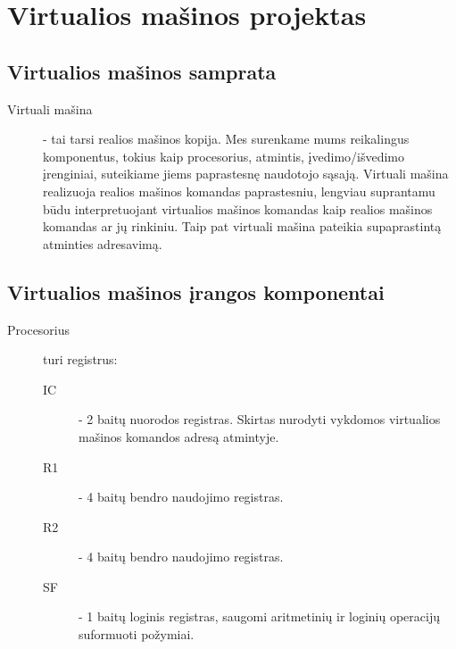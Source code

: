 \section{Virtualios mašinos projektas}

\subsection{Virtualios mašinos samprata}
\begin{description}
\item[Virtuali mašina] - tai tarsi realios mašinos kopija. Mes
surenkame mums reikalingus komponentus, tokius kaip procesorius,
atmintis, įvedimo/išvedimo įrenginiai, suteikiame jiems paprastesnę
naudotojo sąsają. Virtuali mašina realizuoja realios mašinos
komandas paprastesniu, lengviau suprantamu būdu interpretuojant virtualios
mašinos komandas kaip realios mašinos komandas ar jų rinkiniu. Taip pat 
virtuali mašina pateikia supaprastintą atminties adresavimą.
\end{description}

\subsection{Virtualios mašinos įrangos komponentai}
\begin{description}
    \item[Procesorius] turi registrus:
    \begin{description}
        \item[IC] - 2 baitų nuorodos registras. Skirtas nurodyti vykdomos virtualios mašinos komandos adresą atmintyje.
        \item[R1] - 4 baitų bendro naudojimo registras.
        \item[R2] - 4 baitų bendro naudojimo registras.
        \item[SF] - 1 baitų loginis registras, saugomi aritmetinių ir loginių operacijų suformuoti požymiai. 
    \end{description}
\end{description}

